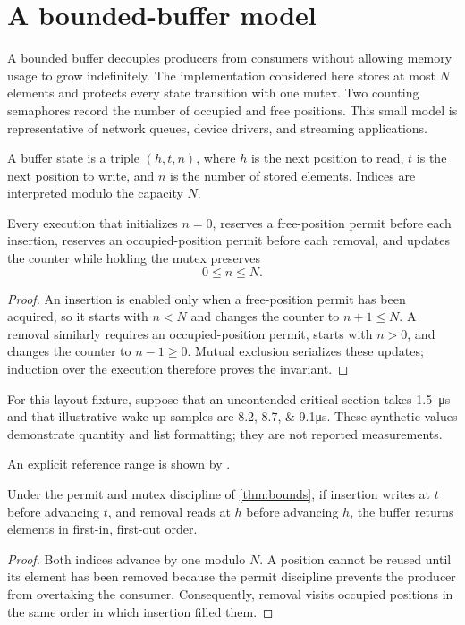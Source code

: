 \documentclass[english]{../../unipd-notes}
\begin{document}
\makecoursefrontmatter
\makecoursemainmatter

\chapter{A bounded-buffer model}

A bounded buffer decouples producers from consumers without allowing memory usage to grow indefinitely. The implementation considered here stores at most $N$ elements and protects every state transition with one mutex. Two counting semaphores record the number of occupied and free positions. This small model is representative of network queues, device drivers, and streaming applications.

\begin{definition}
A buffer state is a triple $(h,t,n)$, where $h$ is the next position to read, $t$ is the next position to write, and $n$ is the number of stored elements. Indices are interpreted modulo the capacity $N$.
\end{definition}

\begin{theorem}\label{thm:bounds}
Every execution that initializes $n=0$, reserves a free-position permit before each insertion, reserves an occupied-position permit before each removal, and updates the counter while holding the mutex preserves
\[
  0 \leq n \leq N.
\]
\end{theorem}
\begin{proof}
An insertion is enabled only when a free-position permit has been acquired, so it starts with $n<N$ and changes the counter to $n+1\leq N$. A removal similarly requires an occupied-position permit, starts with $n>0$, and changes the counter to $n-1\geq0$. Mutual exclusion serializes these updates; induction over the execution therefore proves the invariant.
\end{proof}

For this layout fixture, suppose that an uncontended critical section takes \qty{1.5}{\micro\second} and that illustrative wake-up samples are \numlist{8.2;8.7;9.1}\unit{\micro\second}. These synthetic values demonstrate quantity and list formatting; they are not reported measurements.

An explicit reference range is shown by .

\begin{theorem}\label{thm:fifo}
Under the permit and mutex discipline of \cref{thm:bounds}, if insertion writes at $t$ before advancing $t$, and removal reads at $h$ before advancing $h$, the buffer returns elements in first-in, first-out order.
\end{theorem}
\begin{proof}
Both indices advance by one modulo $N$. A position cannot be reused until its element has been removed because the permit discipline prevents the producer from overtaking the consumer. Consequently, removal visits occupied positions in the same order in which insertion filled them.
\end{proof}
\end{document}
